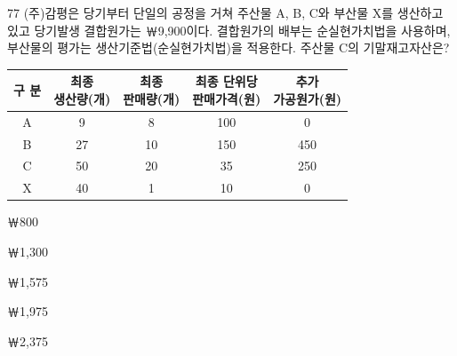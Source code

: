 \begin{question}{77}
(주)감평은 당기부터 단일의 공정을 거쳐 주산물 A, B, C와 부산물 X를 생산하고 있고 당기발생 결합원가는 ￦9,900이다. 결합원가의 배부는 순실현가치법을 사용하며, 부산물의 평가는 생산기준법(순실현가치법)을 적용한다. 주산물 C의 기말재고자산은?

{\small\centering
\begin{tabular}{|c|c|c|c|c|}\hline
구 분 & \makecell{최종\\생산량(개)} & \makecell{최종\\판매량(개)} & \makecell{최종 단위당\\판매가격(원)} & \makecell{추가\\가공원가(원)} \\ \hline
A & 9 & 8 & 100 & 0 \\ \hline
B & 27 & 10 & 150 & 450 \\ \hline
C & 50 & 20 & 35 & 250 \\ \hline
X & 40 & 1 & 10 & 0 \\ \hline
\end{tabular}\par}
\begin{choices}
  \item ￦800
  \item ￦1,300
  \item ￦1,575
  \item ￦1,975
  \item ￦2,375
\end{choices}
\end{question}
